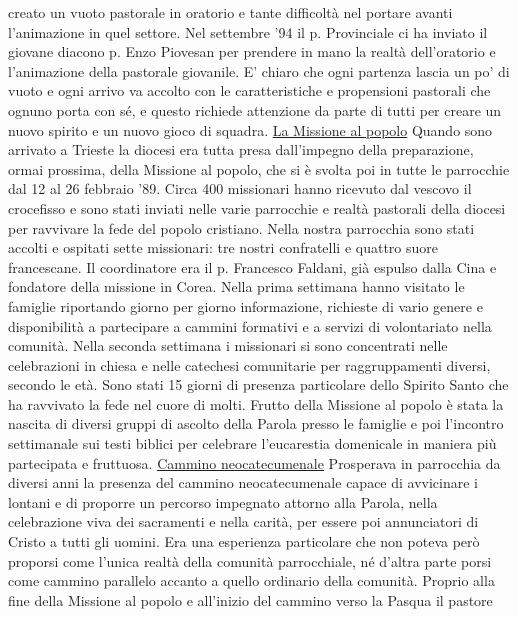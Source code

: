 creato un vuoto pastorale in oratorio e tante difficoltà nel portare avanti l'animazione in quel settore. 
Nel settembre '94 il p. Provinciale ci ha inviato il giovane diacono p. Enzo Piovesan per prendere in 
mano la realtà dell'oratorio e l'animazione della pastorale giovanile. 
E' chiaro che ogni partenza lascia un po' di vuoto e ogni arrivo va accolto con le caratteristiche e 
propensioni pastorali che ognuno porta con sé, e questo richiede attenzione da parte di tutti per 
creare un nuovo spirito e un nuovo gioco di squadra.
\bigbreak
{}
\underline{La Missione al popolo}
\medbreak
Quando sono arrivato a Trieste la diocesi era tutta presa dall'impegno della preparazione, 
ormai prossima, della Missione al popolo, che si è svolta poi in tutte le parrocchie dal 12 al 26 
febbraio '89.
Circa 400 missionari hanno ricevuto dal vescovo il crocefisso e sono stati inviati nelle varie 
parrocchie e realtà pastorali della diocesi per ravvivare la fede del popolo cristiano. Nella nostra 
parrocchia sono stati accolti e ospitati sette missionari: tre nostri confratelli e quattro suore 
francescane. Il coordinatore era il p. Francesco Faldani, già espulso dalla Cina e fondatore della 
missione in Corea. Nella prima settimana hanno visitato le famiglie riportando giorno per giorno 
informazione, richieste di vario genere e disponibilità a partecipare a cammini formativi e a servizi 
di volontariato nella comunità. Nella seconda settimana i missionari si sono concentrati nelle 
celebrazioni in chiesa e nelle catechesi comunitarie per raggruppamenti diversi, secondo le età.
Sono stati 15 giorni di presenza particolare dello Spirito Santo che ha ravvivato la fede nel 
cuore di molti. Frutto della Missione al popolo è stata la nascita di diversi gruppi di ascolto della 
Parola presso le famiglie e poi l'incontro settimanale sui testi biblici per celebrare l'eucarestia 
domenicale in maniera più partecipata e fruttuosa.
\bigbreak
{}
\underline{Cammino neocatecumenale}
\medbreak
Prosperava in parrocchia da diversi anni la presenza del cammino neocatecumenale capace 
di avvicinare i lontani e di proporre un percorso impegnato attorno alla Parola, nella celebrazione 
viva dei sacramenti e nella carità, per essere poi annunciatori di Cristo a tutti gli uomini. Era una 
esperienza particolare che non poteva però proporsi come l'unica realtà della comunità parrocchiale, 
né d'altra parte porsi come cammino parallelo accanto a quello ordinario della comunità. 
Proprio alla fine della Missione al popolo e all'inizio del cammino verso la Pasqua il pastore 
